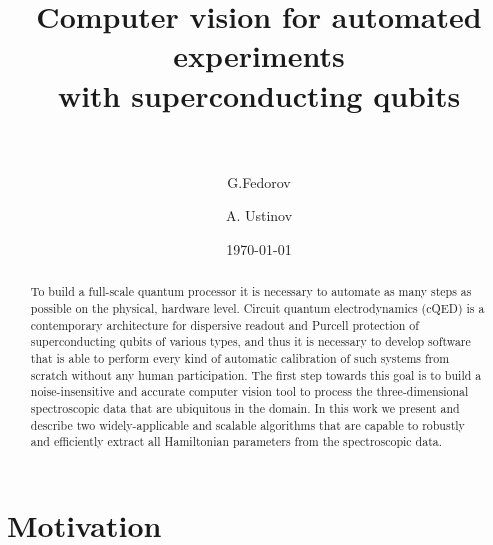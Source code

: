 \documentclass[%
 aip,
 amsmath,amssymb,
 reprint,%
]{revtex4-1}
\begin{document}

\title[Computer vision for automated experiments with superconducting qubits]{Computer vision for automated experiments\\  with superconducting qubits\\~}

\author{G.Fedorov}

%
%

\author{A. Ustinov}
%
%

\date{\today}%

\begin{abstract}
To build a full-scale quantum processor it is necessary to automate as many steps as possible on the physical, hardware level. Circuit quantum electrodynamics (cQED) is a contemporary architecture for dispersive readout and Purcell protection of superconducting qubits of various types, and thus it is necessary to develop software that is able to perform every kind of automatic calibration of such systems from scratch without any human participation. The first step towards this goal is to build a noise-insensitive and accurate computer vision tool to process the three-dimensional spectroscopic data that are ubiquitous in the domain. In this work we present and describe two widely-applicable and scalable algorithms that are capable to robustly and efficiently extract all Hamiltonian parameters from the spectroscopic data. 
\end{abstract}

\maketitle

 \renewcommand*{\figureautorefname}{Fig.}

\section{\label{sec:level1} Motivation}
\end{document}
